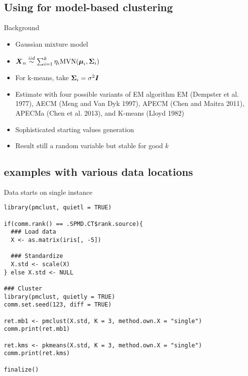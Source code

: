 \subsection{Using \protect{} for model-based clustering}
\makesubcontentsslidessec

\begin{frame}[fragile]
  \begin{block}{Background}
    \begin{itemize}
    \item Gaussian mixture model
    \item  $\boldsymbol{X}_n \overset{iid}{\sim} \sum_{i=1}^k
      \eta_i \mbox{MVN}(\boldsymbol{\mu}_i, \boldsymbol{\Sigma}_i)$
    \item For k-means, take $\boldsymbol{\Sigma}_i = \sigma^2\boldsymbol{I}$
    \item Estimate with four possible variants of EM algorithm EM (Dempster et al. 1977),
      AECM (Meng and Van Dyk 1997), APECM (Chen and Maitra 2011), APECMa (Chen et al.
      2013), and K-means (Lloyd 1982)
    \item Sophisticated starting values generation
    \item Result still a random variable but stable for good $k$
    \end{itemize}
  \end{block}
\end{frame}

\subsection{\protect{} examples with various data locations}

\begin{frame}[fragile]
  \begin{exampleblock}{Data starts on single instance}\pause
    \begin{lstlisting}[title=iris\_single.r]
library(pmclust, quietl = TRUE)

if(comm.rank() == .SPMD.CT$rank.source){
  ### Load data
  X <- as.matrix(iris[, -5])

  ### Standardize
  X.std <- scale(X)
} else X.std <- NULL

### Cluster
library(pmclust, quietly = TRUE)
comm.set.seed(123, diff = TRUE)

ret.mb1 <- pmclust(X.std, K = 3, method.own.X = "single")
comm.print(ret.mb1)

ret.kms <- pkmeans(X.std, K = 3, method.own.X = "single")
comm.print(ret.kms)

finalize()
    \end{lstlisting} %
  \end{exampleblock}
\end{frame}

